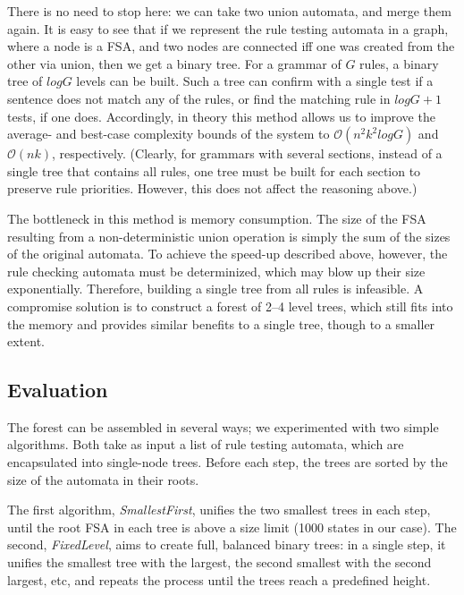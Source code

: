 \documentclass[11pt]{article}
\begin{document}
There is no need to stop here: we can take two union automata, and merge them
again. It is easy to see that if we represent the rule testing automata in a
graph, where a node is a FSA, and two nodes are connected iff one was created
from the other via union, then we get a binary tree. For a grammar of $G$ rules,
a binary tree of $logG$ levels can be built. Such a tree can confirm with a
single test if a sentence does not match any of the rules, or find the matching
rule in $logG + 1$ tests, if one does. Accordingly, in theory this method
allows us to improve the average- and best-case complexity bounds of the system
to $\mathcal{O}(n^2k^2logG)$ and $\mathcal{O}(nk)$, respectively.  %
(Clearly, for grammars with several sections, instead of a single tree that
contains all rules, one tree must be built for each section to preserve rule
priorities. However, this does not affect the reasoning above.)  %

The bottleneck in this method is memory consumption. The size of the FSA
resulting from a non-deterministic union operation is simply the sum of the
sizes of the original automata. To achieve the speed-up described above, however,
the rule checking automata must be determinized, which may blow up their size
exponentially. Therefore, building a single tree from all rules is infeasible.
A compromise solution is to construct a forest of 2--4 level trees, which still
fits into the memory and provides similar benefits to a single tree, though to
a smaller extent.

\subsection{Evaluation}

The forest can be assembled in several ways; we experimented with two simple
algorithms. Both take as input a list of rule testing automata, which are
encapsulated into single-node trees. Before each step, the trees are sorted by
the size of the automata in their roots.

The first algorithm, \textit{SmallestFirst}, unifies the two smallest trees in
each step, until the root FSA in each tree is above a size limit (1000 states in
our case).
The second, \textit{FixedLevel}, aims to create full, balanced binary trees:
in a single step, it unifies the smallest tree with the largest, the second
smallest with the second largest, etc, and repeats the process until the trees
reach a predefined height.
\end{document}
